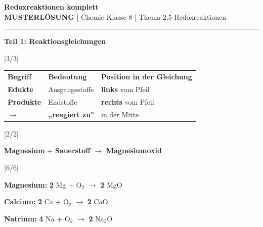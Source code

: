 \documentclass[10pt, a4paper]{article}
\newcommand{\fach}{Chemie}
\newcommand{\thema}{Redoxreaktionen komplett}
\newcommand{\klasse}{8}
\newcommand{\lsg}[1]{\textcolor{loesung}{\textbf{#1}}}
\newcommand{\punktebox}[1]{\hfill\small\textcolor{mittelgrau}{[#1/#1]}}
\begin{document}

\begin{center}
    {\large\bfseries\textcolor{fachfarbe}{\thema}}\\[0.1em]
    {\small \textcolor{loesung}{\textbf{MUSTERLÖSUNG}} | \fach{} Klasse \klasse{} | Thema 2.5 Redoxreaktionen}
\end{center}
\vspace{-0.4em}
\hrule
\vspace{0.3em}


\begin{teilbox}
\textbf{\textcolor{fachfarbe}{Teil 1: Reaktionsgleichungen}}
\end{teilbox}

\vspace{-2pt}

\begin{merkkasten}
\punktebox{3}

\vspace{3pt}
\begin{tabular}{@{}p{3cm}p{4cm}p{6.5cm}@{}}
\textbf{Begriff} & \textbf{Bedeutung} & \textbf{Position in der Gleichung} \\[0.3em]
\lsg{Edukte} & Ausgangsstoffe & \lsg{links} vom Pfeil \\[0.6em]
\lsg{Produkte} & Endstoffe & \lsg{rechts} vom Pfeil \\[0.6em]
$\longrightarrow$ & \lsg{„reagiert zu"} & in der Mitte
\end{tabular}
\end{merkkasten}

\begin{merkkasten}
\punktebox{2}

\vspace{4pt}
\hspace{1.5em} \lsg{Magnesium} + \lsg{Sauerstoff} $\longrightarrow$ \lsg{Magnesiumoxid}
\end{merkkasten}

\begin{merkkasten}
\punktebox{6}

\vspace{4pt}
\textbf{Magnesium:} \hspace{1em} \lsg{2} Mg + O$_2$ $\longrightarrow$ \lsg{2} MgO

\vspace{4pt}
\textbf{Calcium:} \hspace{1.5em} \lsg{2} Ca + O$_2$ $\longrightarrow$ \lsg{2} CaO

\vspace{4pt}
\textbf{Natrium:} \hspace{1.5em} \lsg{4} Na + O$_2$ $\longrightarrow$ \lsg{2} Na$_2$O
\end{merkkasten}
\end{document}
